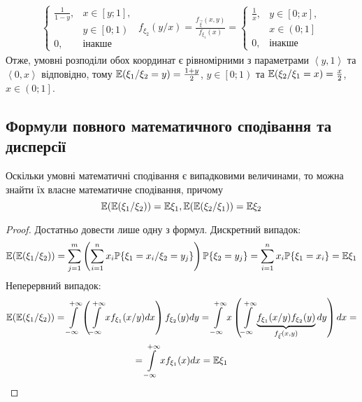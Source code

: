 \begin{example}
\begin{gather*}
\begin{cases}
            \frac{1}{1-y}, & x \in \left[ y; 1\right], \\
            & y \in \left[ 0; 1\right)\\
            0, & \text{інакше}
        \end{cases}\;
        f_{\xi_2}(y/x) = \frac{f_{\vec{\xi}}(x, y)}{f_{\xi_1}(x)} = \begin{cases}
            \frac{1}{x}, & y \in \left[ 0; x\right], \\
            & x \in \left( 0; 1\right] \\
            0, & \text{інакше}
        \end{cases}
    \end{gather*}
    Отже, умовні розподіли обох координат є рівномірними з параметрами $\left< y, 1\right>$ та $\left<0, x\right>$ відповідно,
    тому 
    $\mathbb{E}(\xi_1 / \xi_2 = y) = \frac{1+y}{2}$, $y \in \left[ 0; 1\right)$ та
    $\mathbb{E}(\xi_2 / \xi_1 = x) = \frac{x}{2}$, $x \in \left( 0; 1\right]$.
\end{example}
\subsection{Формули повного математичного сподівання та дисперсії}
\begin{proposition*}
    Оскільки умовні математичні сподівання є випадковими величинами, то можна знайти їх власне математичне сподівання,
    причому 
    \begin{equation}
        \mathbb{E}(\mathbb{E}(\xi_1 / \xi_2)) = \mathbb{E}\xi_1, \mathbb{E}(\mathbb{E}(\xi_2 / \xi_1)) = \mathbb{E}\xi_2
    \end{equation}
\end{proposition*}
\begin{proof} Достатньо довести лише одну з формул.
    Дискретний випадок:
    $$\mathbb{E}(\mathbb{E}(\xi_1 / \xi_2)) = \sum\limits_{j = 1}^m 
    \left(
        \sum\limits_{i=1}^n x_i \mathbb{P}\{\xi_1 = x_i / \xi_2 = y_j\}
    \right) \mathbb{P}\{\xi_2 = y_j\} = 
    \sum\limits_{i=1}^n x_i \mathbb{P}\{\xi_1 = x_i\} = \mathbb{E}\xi_1$$
    Неперервний випадок:
    \begin{gather*}
        \mathbb{E}(\mathbb{E}(\xi_1 / \xi_2)) = \int\limits_{-\infty}^{+\infty} 
        \left(
            \int\limits_{-\infty}^{+\infty} x f_{\xi_1}(x / y) dx
        \right) f_{\xi_2}(y) dy = 
        \int\limits_{-\infty}^{+\infty} x \left(\int\limits_{-\infty}^{+\infty} 
        \underbrace{f_{\xi_1}(x / y) f_{\xi_2}(y)}_{f_{\vec{\xi}}(x, y)}
        dy\right) dx = \\
        = \int\limits_{-\infty}^{+\infty} x f_{\xi_1}(x) dx = \mathbb{E}\xi_1
    \end{gather*}
\end{proof}

